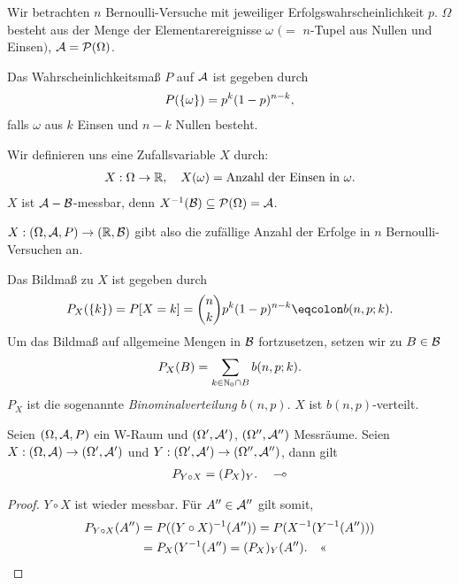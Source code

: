 \begin{bsp}
Wir betrachten $n$ Bernoulli-Versuche mit jeweiliger Erfolgswahrscheinlichkeit
$p$. $\Omega$ besteht aus der Menge der Elementarereignisse $\omega$ $(=$
$n$-Tupel aus Nullen und Einsen$)$, $\AA=\PP(\Omega)$.

Das Wahrscheinlichkeitsmaß $P$ auf $\AA$ ist gegeben durch
\begin{align*}
P(\setd{\omega}) = p^k(1-p)^{n-k},
\end{align*}
falls $\omega$ aus $k$ Einsen und $n-k$ Nullen besteht.

Wir definieren uns eine Zufallsvariable $X$ durch:
\begin{align*}
X: \Omega \to \R,\quad X(\omega) = \text{Anzahl der Einsen in $\omega$}.
\end{align*}
$X$ ist $\AA-\BB$-messbar, denn $X^{-1}(\BB)\subseteq \PP(\Omega) = \AA$.

$X : (\Omega,\AA,P)\to(\R,\BB)$ gibt also die zufällige Anzahl der Erfolge in
$n$ Bernoulli-Versuchen an.

Das Bildmaß zu $X$ ist gegeben durch
\begin{align*}
P_X(\setd{k}) = P[X=k] = \binom{n}{k}p^k(1-p)^{n-k} \defr b(n,p;k).
\end{align*}
Um das Bildmaß auf allgemeine Mengen in $\BB$ fortzusetzen, setzen wir zu
$B\in\BB$
\begin{align*}
P_X(B) = \sum\limits_{k\in\N_0\cap B} b(n,p;k).
\end{align*}
$P_X$ ist die sogenannte \emph{Binominalverteilung} $b(n,p)$. $X$ ist
$b(n,p)$-verteilt.\bsphere
\end{bsp}

\begin{bem}
\label{bem:3.2}
Seien $(\Omega, \AA, P)$ ein W-Raum und
$(\Omega ', \AA')$, $(\Omega '', \AA'')$  Messräume.
Seien
$X: (\Omega , \AA) \to (\Omega ', \AA')$ und $Y: (\Omega ', \AA')\to
(\Omega '', \AA'')$, dann gilt
\begin{align*}
P_{Y \circ X} = (P_{X})_{Y}.\maphere
\end{align*}
\end{bem}
\begin{proof}
$Y\circ X$ ist wieder messbar. Für $A''\in\AA''$ gilt somit,
\begin{align*}
P_{Y\circ X}(A'') &= P((Y\circ X)^{-1}(A'')) =
P(X^{-1}(Y^{-1}(A''))) \\ &= P_X(Y^{-1}(A'') = (P_X)_Y(A'').\qedhere
\end{align*}
\end{proof}

